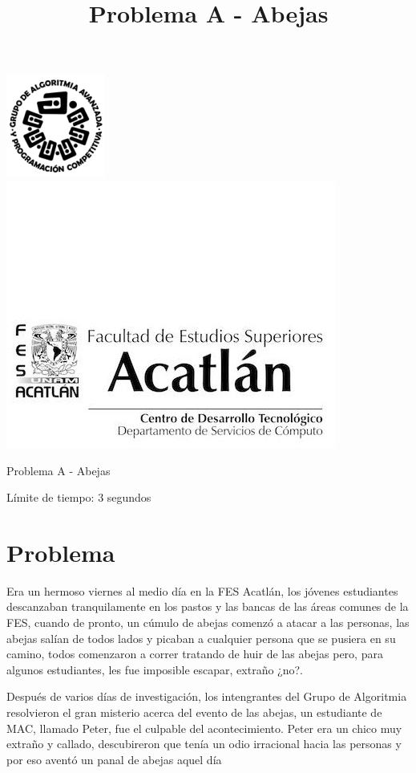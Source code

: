 \documentclass[letter,10pt]{article}
\date{}
\begin{document}
\title{Problema A - Abejas}

\includegraphics[scale=0.6]{logo} \hspace*{9.00cm}
\includegraphics[scale=0.5]{dsc} 
\bigskip
\begin{center}
	\Large Problema A - Abejas
\end{center}

\begin{flushright}
Límite de tiempo: 3 segundos
\par\end{flushright}
\bigskip

\section*{Problema}

Era un hermoso viernes al medio día en la FES Acatlán, los jóvenes estudiantes descanzaban tranquilamente en los pastos y las bancas de las áreas comunes de la FES, cuando de pronto, un cúmulo de abejas comenzó a atacar a las personas, las abejas salían de todos lados y picaban a cualquier persona que se pusiera en su camino, todos comenzaron a correr tratando de huir de las abejas pero, para algunos estudiantes, les fue imposible escapar, extraño ¿no?. 

Después de varios días de investigación, los intengrantes del Grupo de Algoritmia resolvieron el gran misterio acerca del evento de las abejas, un estudiante de MAC, llamado Peter, fue el culpable del acontecimiento. Peter era un chico muy extraño y callado, descubireron que tenía un odio irracional hacia las personas y por eso aventó un panal de abejas aquel día
\end{document}
